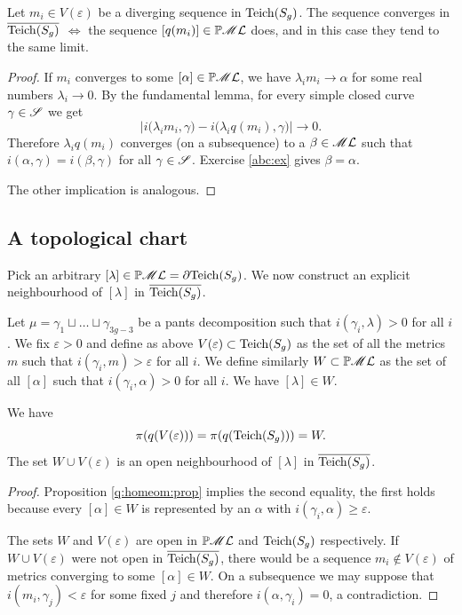 \begin{cor} \label{same:limit:cor}
Let $m_i \in V(\varepsilon)$ be a diverging sequence in ${\rm Teich}(S_g)$. The sequence converges in $\overline{{\rm Teich}(S_g)}$ $\Longleftrightarrow$ the sequence $[q(m_i)]\in\mathbb{P}\mathscr{M}\mathcal{L}$ does, and in this case they tend to the same limit.
\end{cor}
\begin{proof}
If $m_i$ converges to some $[\alpha]\in\mathbb{P}\mathscr{M}\mathcal{L}$, we have $\lambda_im_i \to \alpha$ for some real numbers $\lambda_i \to 0$. By the fundamental lemma, for every simple closed curve $\gamma \in \mathscr{S}$ we get
$$\big|i \big(\lambda_im_i, \gamma\big) - i\big(\lambda_iq(m_i), \gamma\big) \big| \to 0.$$
Therefore $\lambda_iq(m_i)$ converges (on a subsequence) to a $\beta\in\mathscr{M}\mathcal{L}$ such that $i(\alpha, \gamma) = i(\beta, \gamma)$ for all $\gamma \in \mathscr{S}$. Exercise \ref{abc:ex} gives $\beta =\alpha$.

The other implication is analogous.
\end{proof}

\subsection{A topological chart}
Pick an arbitrary $[\lambda]\in \mathbb{P}\mathscr{M}\mathcal{L} = \partial {\rm Teich}(S_g)$. We now construct an explicit neighbourhood of $[\lambda]$ in $\overline{{\rm Teich}(S_g)}$. 

Let $\mu = \gamma_1\sqcup \ldots \sqcup \gamma_{3g-3}$ be a pants decomposition such that $i(\gamma_i, \lambda)>0$ for all $i$. We fix $\varepsilon>0$ and define as above $V(\varepsilon)\subset {\rm Teich}(S_g)$ as the set of all the metrics $m$ such that $i(\gamma_i, m)> \varepsilon$ for all $i$. We define similarly $W\subset \mathbb{P}\mathscr{M}\mathcal{L}$ as the set of all $[\alpha]$ such that $i(\gamma_i, \alpha) > 0 $ for all $i$. We have $[\lambda]\in W$. 

\begin{prop} We have 
$$\pi(q(V(\varepsilon))) = \pi(q({\rm Teich}(S_g))) = W.$$
The set $W\cup V(\varepsilon)$ is an open neighbourhood of $[\lambda]$ in $\overline{{\rm Teich}(S_g)}$.
\end{prop}
\begin{proof}
Proposition \ref{q:homeom:prop} implies the second equality, the first holds because every $[\alpha] \in W$ is represented by an $\alpha$ with $i(\gamma_i, \alpha)\geqslant \varepsilon$.

The sets $W$ and $V(\varepsilon)$ are open in $\mathbb{P}\mathscr{M}\mathcal{L}$ and ${\rm Teich}(S_g)$ respectively.
If $W\cup V(\varepsilon)$ were not open in $\overline{{\rm Teich}(S_g)}$, there would be a sequence $m_i \not\in V(\varepsilon)$ of metrics converging to some $[\alpha]\in W$. On a subsequence we may suppose that $i(m_i,\gamma_j)<\varepsilon$ for some fixed $j$ and therefore $i(\alpha, \gamma_i)=0$, a contradiction.
\end{proof}

